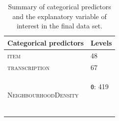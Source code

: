\begin{table}\fontsize{10}{11}
\caption{Summary of categorical predictors and the explanatory variable of interest in the final data set.}
\label{tab:4.2}
\centering
\begin{tabular}{ll}
\lsptoprule
Categorical predictors                & Levels                                                   \\
\midrule
\textsc{item}                                  & 48                                                       \\
\textsc{transcription}                         & 67                                                       \\
\multirow{2}{*}{\textsc{NeighbourhoodDensity}} & \texttt{0}: 419

~ ~~


\end{tabular}
\end{table}
